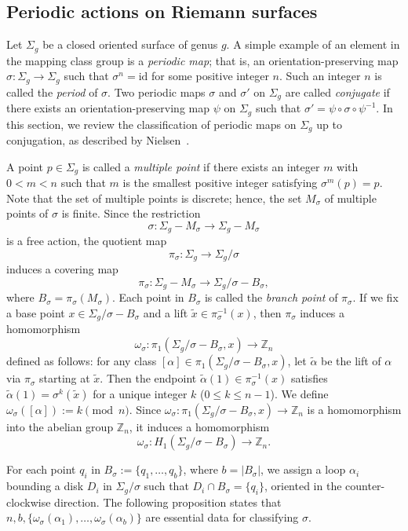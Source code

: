 \documentclass[10pt,a4paper,reqno]{amsart}
\theoremstyle{definition}
\numberwithin{equation}{section}
\numberwithin{figure}{section}
\newcommand{\Z}{\mathbb{Z}}
\newcommand{\arrowr}{\rightarrow}
\begin{document}
\subsection{Periodic actions on Riemann surfaces} \label{sec:period}
Let $\Sigma_g$ be a closed oriented surface of genus $g$.
A simple example of an element in the mapping class group is a \textit{periodic map}; that is, an orientation-preserving map
$\sigma:\Sigma_g \rightarrow \Sigma_g$ such that $\sigma^n=\text{id}$ for some positive integer $n$.
Such an integer $n$ is called the \textit{period} of $\sigma$.
Two periodic maps $\sigma$ and $\sigma'$ on $\Sigma_g$ are called \textit{conjugate} 
if there exists an orientation-preserving map $\psi$ on $\Sigma_g$ such that $\sigma'=\psi \circ \sigma \circ \psi^{-1}$.
In this section, we review the classification of periodic maps on $\Sigma_g$ up to conjugation, 
as described by Nielsen~\cite{Ni}.

A point $p \in \Sigma_g$ is called a \textit{multiple point} if there exists an integer $m$ with $0<m<n$ such that 
$m$ is the smallest positive integer satisfying $\sigma^m(p)=p$.
Note that the set of multiple points is discrete; hence, the set $M_\sigma$ of multiple points of $\sigma$ is finite.
Since the restriction \[\sigma: \Sigma_g-M_\sigma \rightarrow \Sigma_g -M_\sigma\] is a free action, the quotient map 
\[\pi_\sigma: \Sigma_g \rightarrow \Sigma_g/\sigma\] induces a covering map
\[\pi_\sigma: \Sigma_g -M_\sigma \rightarrow \Sigma_g/\sigma - B_\sigma,\] where $B_\sigma=\pi_\sigma(M_\sigma)$.
Each point in $B_\sigma$ is called the \textit{branch point} of $\pi_\sigma$.
If we fix a base point $x\in \Sigma_g/\sigma -B_\sigma$ and a lift $\tilde{x}\in \pi_\sigma^{-1}(x)$, then $\pi_\sigma$ induces a homomorphism
\[\omega_\sigma: \pi_1(\Sigma_g/\sigma -B_\sigma,x) \arrowr \Z_n\] defined as follows:
for any class $\left[\alpha\right]\in \pi_1(\Sigma_g/\sigma -B_\sigma,x)$, let $\tilde{\alpha}$ be the lift of $\alpha$ via $\pi_\sigma$ starting at $\tilde{x}$.
Then the endpoint $\tilde{\alpha}(1)\in \pi_\sigma^{-1}(x)$ satisfies $\tilde{\alpha}(1)=\sigma^k(\tilde{x})$ for a unique integer $k$ ($0\le k \le n-1$). 
We define $\omega_\sigma(\left[\alpha\right]):=k \pmod n$.
Since $\omega_\sigma: \pi_1(\Sigma_g/\sigma -B_\sigma,x) \arrowr \Z_n$ is a homomorphism into the abelian group $\Z_n$, it induces a homomorphism
\[\omega_\sigma: H_1(\Sigma_g/\sigma -B_\sigma) \arrowr \Z_n.\]

For each point $q_i$ in $B_\sigma:=\{q_1,\dots,q_b\}$, where $b=| B_\sigma |$, 
we assign a loop $\alpha_i$ bounding a disk $D_i$ in $\Sigma_g/\sigma$ such that $D_i \cap B_\sigma=\{q_i\}$, oriented in the counter-clockwise direction.
The following proposition states that $n,b, \{\omega_\sigma(\alpha_1),\dots,\omega_\sigma(\alpha_b)\}$ are essential data for classifying $\sigma$.
\end{document}
